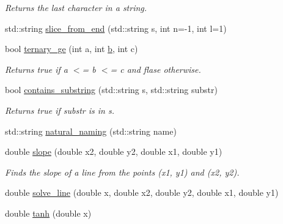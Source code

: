 \begin{DoxyCompactItemize}
\begin{DoxyCompactList}\small\item\em Returns the last character in a string. \end{DoxyCompactList}\item 
std\-::string \hyperlink{namespacepyne_abe1c85ef0d36e8e3eeb02076db773c88}{slice\-\_\-from\-\_\-end} (std\-::string s, int n=-\/1, int l=1)
\item 
\hypertarget{namespacepyne_a5bf23fa851054a44f872c65f5592db8c}{bool \hyperlink{namespacepyne_a5bf23fa851054a44f872c65f5592db8c}{ternary\-\_\-ge} (int a, int \hyperlink{namespacepyne_a12664d38214170260d6a69c4f5dda8da}{b}, int c)}\label{namespacepyne_a5bf23fa851054a44f872c65f5592db8c}

\begin{DoxyCompactList}\small\item\em Returns true if {\itshape a} $<$= {\itshape b} $<$= {\itshape c} and flase otherwise. \end{DoxyCompactList}\item 
\hypertarget{namespacepyne_aacdc15f9fd3df02a25971257b3f83b47}{bool \hyperlink{namespacepyne_aacdc15f9fd3df02a25971257b3f83b47}{contains\-\_\-substring} (std\-::string s, std\-::string substr)}\label{namespacepyne_aacdc15f9fd3df02a25971257b3f83b47}

\begin{DoxyCompactList}\small\item\em Returns true if {\itshape substr} is in {\itshape s}. \end{DoxyCompactList}\item 
std\-::string \hyperlink{namespacepyne_aa136c046c495673c1167472b96901e33}{natural\-\_\-naming} (std\-::string name)
\item 
\hypertarget{namespacepyne_a98db52b7243a761ad6f2819478eeda30}{double \hyperlink{namespacepyne_a98db52b7243a761ad6f2819478eeda30}{slope} (double x2, double y2, double x1, double y1)}\label{namespacepyne_a98db52b7243a761ad6f2819478eeda30}

\begin{DoxyCompactList}\small\item\em Finds the slope of a line from the points ({\itshape x1}, {\itshape y1}) and ({\itshape x2}, {\itshape y2}). \end{DoxyCompactList}\item 
double \hyperlink{namespacepyne_a943fe41cf25ff550684aabffe5971e1e}{solve\-\_\-line} (double x, double x2, double y2, double x1, double y1)
\item 
\hypertarget{namespacepyne_a598ae3065c54502a23495eaf06865d1d}{double \hyperlink{namespacepyne_a598ae3065c54502a23495eaf06865d1d}{tanh} (double x)}\label{namespacepyne_a598ae3065c54502a23495eaf06865d1d}


\end{DoxyCompactItemize}
